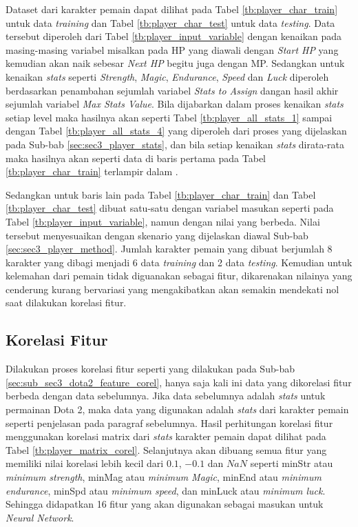 Dataset dari karakter pemain dapat dilihat pada Tabel \ref{tb:player_char_train} untuk data \textit{training} dan Tabel \ref{tb:player_char_test} untuk data \textit{testing}. Data tersebut diperoleh dari Tabel \ref{tb:player_input_variable} dengan kenaikan pada masing-masing variabel misalkan pada HP yang diawali dengan \textit{Start HP} yang kemudian akan naik sebesar \textit{Next HP} begitu juga dengan MP. Sedangkan untuk kenaikan \textit{stats} seperti \textit{Strength}, \textit{Magic}, \textit{Endurance}, \textit{Speed} dan \textit{Luck} diperoleh berdasarkan penambahan sejumlah variabel \textit{Stats to Assign} dangan hasil akhir sejumlah variabel \textit{Max Stats Value}. Bila dijabarkan dalam proses kenaikan \textit{stats} setiap level maka hasilnya akan seperti Tabel \ref{tb:player_all_stats_1} sampai dengan Tabel \ref{tb:player_all_stats_4} yang diperoleh dari proses yang dijelaskan pada Sub-bab \ref{sec:sec3_player_stats}, dan bila setiap kenaikan \textit{stats} dirata-rata maka hasilnya akan seperti data di baris pertama pada Tabel \ref{tb:player_char_train} terlampir dalam . 
\vspace{1ex}

Sedangkan untuk baris lain pada Tabel \ref{tb:player_char_train} dan Tabel \ref{tb:player_char_test} dibuat satu-satu dengan variabel masukan seperti pada Tabel \ref{tb:player_input_variable}, namun dengan nilai yang berbeda. Nilai tersebut menyesuaikan dengan skenario yang dijelaskan diawal Sub-bab \ref{sec:sec3_player_method}. Jumlah karakter pemain yang dibuat berjumlah 8 karakter yang dibagi menjadi 6 data \textit{training} dan 2 data \textit{testing}.  Kemudian untuk kelemahan dari pemain tidak diguanakan sebagai fitur, dikarenakan nilainya yang cenderung kurang bervariasi yang mengakibatkan akan semakin mendekati nol saat dilakukan korelasi fitur.
\vspace{1ex}

\subsection{Korelasi Fitur}
\label{sec:sub_sec3_player_feature_corel}
\vspace{1ex}

Dilakukan proses korelasi fitur seperti yang dilakukan pada Sub-bab \ref{sec:sub_sec3_dota2_feature_corel}, hanya saja kali ini data yang dikorelasi fitur berbeda dengan data sebelumnya. Jika data sebelumnya adalah \textit{stats} untuk permainan Dota 2, maka data yang digunakan adalah \textit{stats} dari karakter pemain seperti penjelasan pada paragraf sebelumnya. Hasil perhitungan korelasi fitur menggunakan korelasi matrix dari \textit{stats} karakter pemain dapat dilihat pada Tabel \ref{tb:player_matrix_corel}. Selanjutnya akan dibuang semua fitur yang memiliki nilai korelasi lebih kecil dari $0.1$, $-0.1$ dan $NaN$ seperti minStr atau \textit{minimum strength}, minMag atau \textit{minimum Magic}, minEnd atau \textit{minimum endurance}, minSpd atau \textit{minimum speed}, dan minLuck atau \textit{minimum luck}. Sehingga didapatkan 16 fitur yang akan digunakan sebagai masukan untuk \textit{Neural Network}.
\vspace{-1ex}

